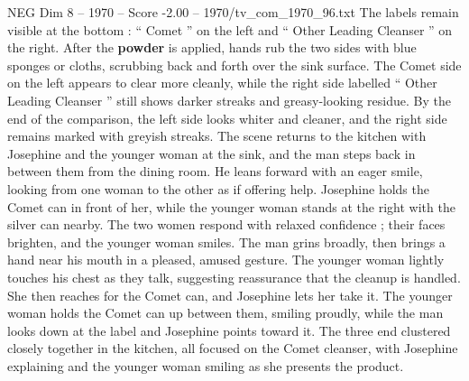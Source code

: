 \begin{textsample}{NEG Dim 8 – 1970 – Score -2.00 – 1970/tv\_com\_1970\_96.txt}
The labels remain visible at the bottom : “ Comet ” on the left and “ Other Leading Cleanser ” on the right.
After the \textbf{powder} is applied, hands rub the two sides with blue sponges or cloths, scrubbing back and forth over the sink surface.
The Comet side on the left appears to clear more cleanly, while the right side labelled “ Other Leading Cleanser ” still shows darker streaks and greasy-looking residue.
By the end of the comparison, the left side looks whiter and cleaner, and the right side remains marked with greyish streaks.
The scene returns to the kitchen with Josephine and the younger woman at the sink, and the man steps back in between them from the dining room.
He leans forward with an eager smile, looking from one woman to the other as if offering help.
Josephine holds the Comet can in front of her, while the younger woman stands at the right with the silver can nearby.
The two women respond with relaxed confidence ; their faces brighten, and the younger woman smiles.
The man grins broadly, then brings a hand near his mouth in a pleased, amused gesture.
The younger woman lightly touches his chest as they talk, suggesting reassurance that the cleanup is handled.
She then reaches for the Comet can, and Josephine lets her take it.
The younger woman holds the Comet can up between them, smiling proudly, while the man looks down at the label and Josephine points toward it.
The three end clustered closely together in the kitchen, all focused on the Comet cleanser, with Josephine explaining and the younger woman smiling as she presents the product.

\end{textsample}
